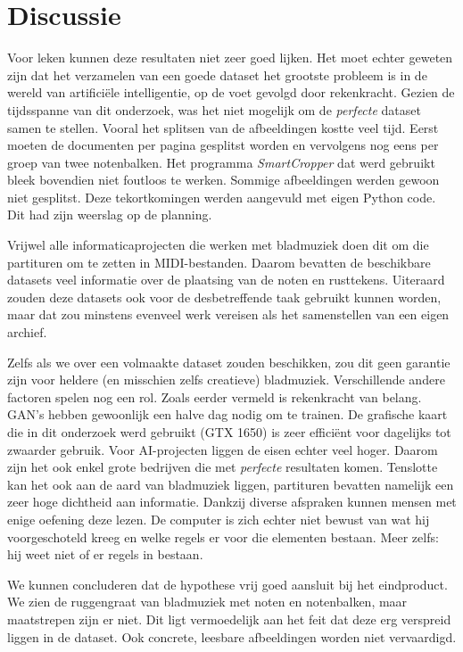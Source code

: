 \documentclass[dutch, twoside, a4paper, 10pt]{article}
\begin{document}
\section{Discussie}
\noindent Voor leken kunnen deze resultaten niet zeer goed lijken. Het moet echter geweten zijn dat het verzamelen van een goede dataset het grootste probleem is in de wereld van artificiële intelligentie, op de voet gevolgd door rekenkracht. Gezien de tijdsspanne van dit onderzoek, was het niet mogelijk om de \textit{perfecte} dataset samen te stellen. Vooral het splitsen van de afbeeldingen kostte veel tijd. Eerst moeten de documenten per pagina gesplitst worden en vervolgens nog eens per groep van twee notenbalken. Het programma \textit{SmartCropper} dat werd gebruikt bleek bovendien niet foutloos te werken. Sommige afbeeldingen werden gewoon niet gesplitst. Deze tekortkomingen werden aangevuld met eigen Python code. Dit had zijn weerslag op de planning.
\par\bigskip\noindent
Vrijwel alle informaticaprojecten die werken met bladmuziek doen dit om die partituren om te zetten in MIDI-bestanden. Daarom bevatten de beschikbare datasets veel informatie over de plaatsing van de noten en rusttekens. Uiteraard zouden deze datasets ook voor de desbetreffende taak gebruikt kunnen worden, maar dat zou minstens evenveel werk vereisen als het samenstellen van een eigen archief.
\par\bigskip\noindent
Zelfs als we over een volmaakte dataset zouden beschikken, zou dit geen garantie zijn voor heldere (en misschien zelfs creatieve) bladmuziek. Verschillende andere factoren spelen nog een rol. Zoals eerder vermeld is rekenkracht van belang. GAN's hebben gewoonlijk een halve dag nodig om te trainen. De grafische kaart die in dit onderzoek werd gebruikt (GTX 1650) is zeer efficiënt voor dagelijks tot zwaarder gebruik. Voor AI-projecten liggen de eisen echter veel hoger. Daarom zijn het ook enkel grote bedrijven die met \textit{perfecte} resultaten komen. Tenslotte kan het ook aan de aard van bladmuziek liggen, partituren bevatten namelijk een zeer hoge dichtheid aan informatie. Dankzij diverse afspraken kunnen mensen met enige oefening deze lezen. De computer is zich echter niet bewust van wat hij voorgeschoteld kreeg en welke regels er voor die elementen bestaan. Meer zelfs: hij weet niet of er regels in bestaan.
\par\bigskip\noindent
We kunnen concluderen dat de hypothese vrij goed aansluit bij het eindproduct. We zien de ruggengraat van bladmuziek met noten en notenbalken, maar maatstrepen zijn er niet. Dit ligt vermoedelijk aan het feit dat deze erg verspreid liggen in de dataset. Ook concrete, leesbare afbeeldingen worden niet vervaardigd. 
\end{document}
